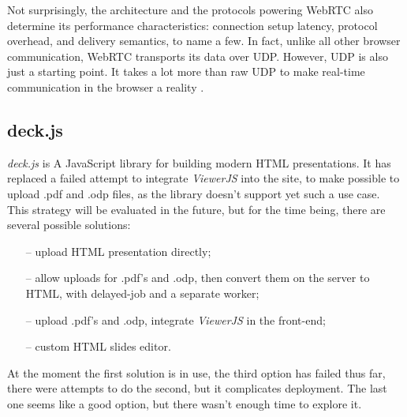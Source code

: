 Not surprisingly, the architecture and the protocols powering WebRTC also
determine its performance characteristics: connection setup latency, protocol
overhead, and delivery semantics, to name a few. In fact, unlike all other
browser communication, WebRTC transports its data over UDP. However, UDP is also
just a starting point. It takes a lot more than raw UDP to make real-time
communication in the browser a reality \citep{high_perf_browser}.

\subsection{deck.js}
\textit{deck.js} is A JavaScript library for building modern HTML presentations.
It has replaced a failed attempt to integrate \textit{ViewerJS} into the site, to make possible
to upload .pdf and .odp files, as the library doesn't support yet such a use case\citep{githubissue}.
This strategy will be evaluated in the future, but for the time being, there are several possible solutions:
\begin{enumerate}
    \item[--] upload HTML presentation directly;
    \item[--] allow uploads for .pdf's and .odp, then convert them on the server to HTML, with delayed-job and a separate worker;
    \item[--] upload .pdf's and .odp, integrate \textit{ViewerJS} in the front-end;
    \item[--] custom HTML slides editor.
\end{enumerate}
At the moment the first solution is in use, the third option has failed thus
far, there were attempts to do the second, but it complicates deployment.
The last one seems like a good option, but there wasn't enough time to explore it.

